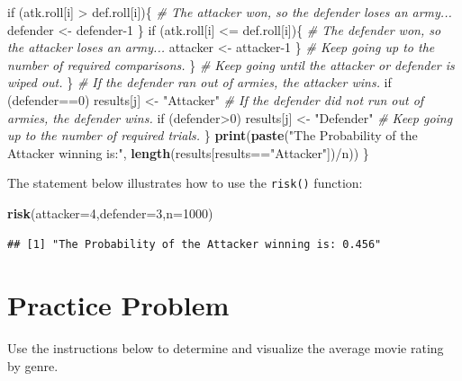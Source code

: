 \documentclass[]{book}
\newenvironment{Shaded}{\begin{snugshade}}{\end{snugshade}}
\newcommand{\KeywordTok}[1]{\textcolor[rgb]{0.13,0.29,0.53}{\textbf{{#1}}}}
\newcommand{\DataTypeTok}[1]{\textcolor[rgb]{0.13,0.29,0.53}{{#1}}}
\newcommand{\DecValTok}[1]{\textcolor[rgb]{0.00,0.00,0.81}{{#1}}}
\newcommand{\StringTok}[1]{\textcolor[rgb]{0.31,0.60,0.02}{{#1}}}
\newcommand{\CommentTok}[1]{\textcolor[rgb]{0.56,0.35,0.01}{\textit{{#1}}}}
\newcommand{\NormalTok}[1]{{#1}}
\begin{document}
\begin{Shaded}
\begin{Highlighting}[]
        \NormalTok{if (atk.roll[i] >}\StringTok{ }\NormalTok{def.roll[i])\{}
          \CommentTok{# The attacker won, so the defender loses an army...}
          \NormalTok{defender <-}\StringTok{ }\NormalTok{defender}\DecValTok{-1}
        \NormalTok{\}}
        \NormalTok{if (atk.roll[i] <=}\StringTok{ }\NormalTok{def.roll[i])\{}
          \CommentTok{# The defender won, so the attacker loses an army...}
          \NormalTok{attacker <-}\StringTok{ }\NormalTok{attacker}\DecValTok{-1}
        \NormalTok{\}}
        \CommentTok{# Keep going up to the number of required comparisons.}
      \NormalTok{\}}
      \CommentTok{# Keep going until the attacker or defender is wiped out.}
    \NormalTok{\}}
    \CommentTok{# If the defender ran out of armies, the attacker wins.}
    \NormalTok{if (defender==}\DecValTok{0}\NormalTok{) results[j] <-}\StringTok{ "Attacker"}
    \CommentTok{# If the defender did not run out of armies, the defender wins.}
    \NormalTok{if (defender>}\DecValTok{0}\NormalTok{) results[j] <-}\StringTok{ "Defender"}
    \CommentTok{# Keep going up to the number of required trials.}
  \NormalTok{\}}
  \KeywordTok{print}\NormalTok{(}\KeywordTok{paste}\NormalTok{(}\StringTok{"The Probability of the Attacker winning is:"}\NormalTok{,}
              \KeywordTok{length}\NormalTok{(results[results==}\StringTok{"Attacker"}\NormalTok{])/n))}
\NormalTok{\}}
\end{Highlighting}
\end{Shaded}

The statement below illustrates how to use the \texttt{risk()} function:

\begin{Shaded}
\begin{Highlighting}[]
\KeywordTok{risk}\NormalTok{(}\DataTypeTok{attacker=}\DecValTok{4}\NormalTok{,}\DataTypeTok{defender=}\DecValTok{3}\NormalTok{,}\DataTypeTok{n=}\DecValTok{1000}\NormalTok{)}
\end{Highlighting}
\end{Shaded}

\begin{verbatim}
## [1] "The Probability of the Attacker winning is: 0.456"
\end{verbatim}

\section{Practice Problem}\label{practice-problem-3}

Use the instructions below to determine and visualize the average movie
rating by genre.
\end{document}
